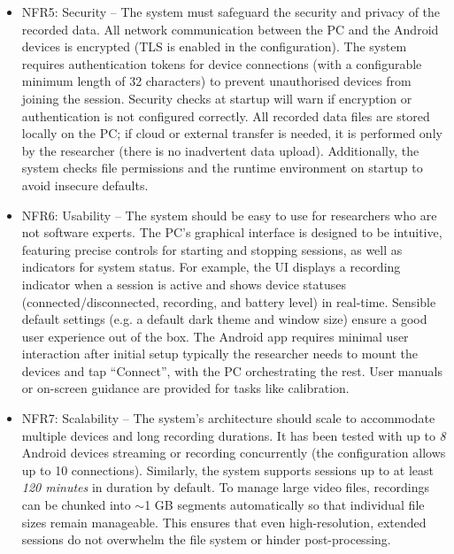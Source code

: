 \begin{itemize}
    \item NFR5: Security -- The system must safeguard the security and privacy of the recorded data. All network communication between the PC and the Android devices is encrypted (TLS is enabled in the configuration). The system requires authentication tokens for device connections (with a configurable minimum length of 32 characters) to prevent unauthorised devices from joining the session. Security checks at startup will warn if encryption or authentication is not configured correctly. All recorded data files are stored locally on the PC; if cloud or external transfer is needed, it is performed only by the researcher (there is no inadvertent data upload). Additionally, the system checks file permissions and the runtime environment on startup to avoid insecure defaults.

    \item NFR6: Usability -- The system should be easy to use for researchers who are not software experts. The PC's graphical interface is designed to be intuitive, featuring precise controls for starting and stopping sessions, as well as indicators for system status. For example, the UI displays a recording indicator when a session is active and shows device statuses (connected/disconnected, recording, and battery level) in real-time. Sensible default settings (e.g. a default dark theme and window size) ensure a good user experience out of the box. The Android app requires minimal user interaction after initial setup \textemdash typically the researcher needs to mount the devices and tap ``Connect'', with the PC orchestrating the rest. User manuals or on-screen guidance are provided for tasks like calibration.

    \item NFR7: Scalability -- The system's architecture should scale to accommodate multiple devices and long recording durations. It has been tested with up to \emph{8} Android devices streaming or recording concurrently (the configuration allows up to 10 connections). Similarly, the system supports sessions up to at least \emph{120 minutes} in duration by default. To manage large video files, recordings can be chunked into $\sim$1 GB segments automatically so that individual file sizes remain manageable. This ensures that even high-resolution, extended sessions do not overwhelm the file system or hinder post-processing.


\end{itemize}
